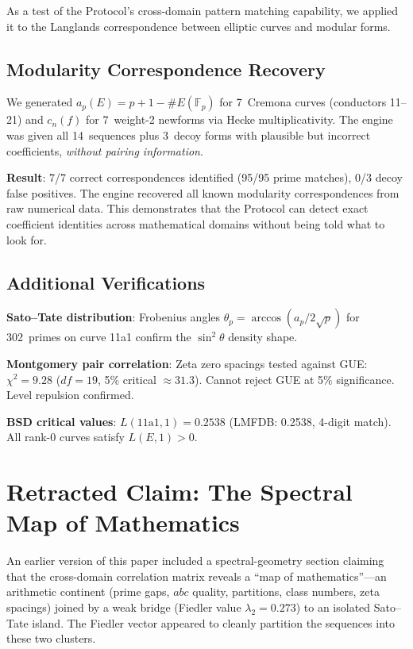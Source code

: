\documentclass[11pt,a4paper]{article}
\begin{document}
As a test of the Protocol's cross-domain pattern matching capability, we
applied it to the Langlands correspondence between elliptic curves and
modular forms.

\subsection{Modularity Correspondence Recovery}

We generated $a_p(E) = p + 1 - \#E(\mathbb{F}_p)$ for 7~Cremona curves
(conductors 11--21) and $c_n(f)$ for 7~weight-2 newforms via Hecke
multiplicativity. The engine was given all 14~sequences plus 3~decoy
forms with plausible but incorrect coefficients, \emph{without pairing
information}.

\textbf{Result}: 7/7 correct correspondences identified (95/95 prime
matches), 0/3 decoy false positives. The engine recovered all known
modularity correspondences from raw numerical data. This demonstrates
that the Protocol can detect exact coefficient identities across
mathematical domains without being told what to look for.

\subsection{Additional Verifications}

\textbf{Sato--Tate distribution}: Frobenius angles
$\theta_p = \arccos(a_p / 2\sqrt{p})$ for 302~primes on curve 11a1
confirm the $\sin^2\theta$ density shape.

\textbf{Montgomery pair correlation}: Zeta zero spacings tested against
GUE: $\chi^2 = 9.28$ ($df = 19$, 5\% critical $\approx 31.3$). Cannot
reject GUE at 5\% significance. Level repulsion confirmed.

\textbf{BSD critical values}: $L(11\text{a}1, 1) = 0.2538$ (LMFDB:
0.2538, 4-digit match). All rank-0 curves satisfy $L(E,1) > 0$.


\section{Retracted Claim: The Spectral Map of Mathematics}
\label{sec:spectral}

An earlier version of this paper included a spectral-geometry section
claiming that the cross-domain correlation matrix reveals a ``map of
mathematics''---an arithmetic continent (prime gaps, $abc$ quality,
partitions, class numbers, zeta spacings) joined by a weak bridge
(Fiedler value $\lambda_2 = 0.273$) to an isolated Sato--Tate island.
The Fiedler vector appeared to cleanly partition the sequences into
these two clusters.
\end{document}
